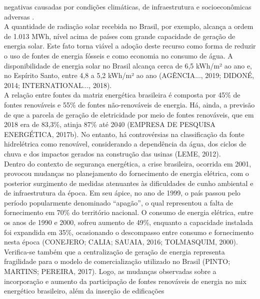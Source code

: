      negativas    causadas    por    condições    climáticas,    de    infraestrutura    
     e socioeconômicas adversas \cite{Pikas2014,Pikas2017}.\\
     A quantidade de radiação solar recebida no Brasil, por exemplo, alcança a ordem de 1.013 MWh, 
     nível acima de países com grande capacidade de geração de energia solar. Este fato 
     torna viável a  adoção  deste  recurso  como  forma  de  reduzir  o  uso  de  fontes  
     de  energia  fósseis  e  como economia  no  consumo  de  água.  A  disponibilidade  de  energia
     solar  no  Brasil  alcança  cerca  de 6,5 kWh/m²  ao  ano  e,  no  Espírito  Santo,  
     entre  4,8  a  5,2 kWh/m²  ao  ano  (AGÊNCIA...,  2019; DIDONÉ, 2014; INTERNATIONAL..., 2018).\\ 
     A relação entre fontes da matriz energética brasileira é composta por 45\% de fontes renováveis
     e 55\% de fontes não-renováveis de energia. Há, ainda, a previsão de que a parcela de geração
     de eletricidade  por  meio  de  fontes  renováveis,  que  em  2018  era  de  83,3\%,  atinja  
     87\%  até  2040 (EMPRESA DE PESQUISA ENERGÉTICA, 2017b). No entanto, há controvérsias na 
     classificação da fonte hidrelétrica como renovável, considerando a dependência da água, 
     dos ciclos de chuva e dos impactos gerados na construção das usinas (LEME, 2012).\\
     Dentro  do  contexto  de  segurança  energética,  a  crise  brasileira,  ocorrida  em  2001,  
     provocou mudanças no planejamento do fornecimento de energia elétrica, com o posterior 
     surgimento de medidas  atenuantes  às dificuldades  de  cunho  ambiental  e  de  infraestrutura  
     da  época.  Em  seu ápice, no ano de 1999, o país passou pelo período popularmente denominado “apagão”, 
     o qual representou  a  falta  de  fornecimento  em  70\%  do  território  nacional.  
     O  consumo  de  energia elétrica, entre os anos de 1990 e 2000, sofreu aumento de 49\%, 
     enquanto a capacidade instalada foi expandida em 35\%, ocasionando o descompasso entre 
     consumo e fornecimento nesta época (CONEJERO; CALIA; SAUAIA, 2016; TOLMASQUIM, 2000).\\ 
     Verifica-se  também  que  a  centralização  de  geração  de  energia  representa  fragilidade  
     para  o modelo  de  comercialização  utilizado  no  Brasil  (PINTO;  MARTINS;  PEREIRA,  2017). 
     Logo,  as mudanças observadas sobre a incorporação e aumento da participação de fontes 
     renováveis de energia  no mix  energético  brasileiro,  além  da  inserção  de  edificações  
